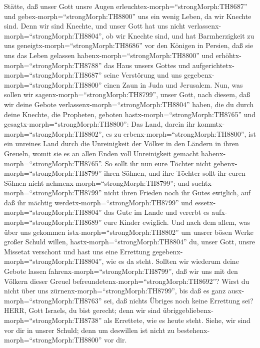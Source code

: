 Stätte, daß unser Gott unsre Augen
erleuchtex-morph=``strongMorph:TH8687'' und
gebex-morph=``strongMorph:TH8800'' uns ein wenig Leben, da wir Knechte
sind.  Denn wir sind Knechte, und unser Gott hat uns nicht
verlassenx-morph=``strongMorph:TH8804'', ob wir Knechte sind, und hat
Barmherzigkeit zu uns geneigtx-morph=``strongMorph:TH8686'' vor den
Königen in Persien, daß sie uns das Leben gelassen
habenx-morph=``strongMorph:TH8800'' und
erhöhtx-morph=``strongMorph:TH8788'' das Haus unsers Gottes und
aufgerichtetx-morph=``strongMorph:TH8687'' seine Verstörung und uns
gegebenx-morph=``strongMorph:TH8800'' einen Zaun in Juda und Jerusalem.
 Nun, was sollen wir sagenx-morph=``strongMorph:TH8799'',
unser Gott, nach diesem, daß wir deine Gebote
verlassenx-morph=``strongMorph:TH8804'' haben,  die du
durch deine Knechte, die Propheten, geboten
hastx-morph=``strongMorph:TH8765'' und
gesagtx-morph=``strongMorph:TH8800'': Das Land, darein ihr
kommtx-morph=``strongMorph:TH8802'', es zu
erbenx-morph=``strongMorph:TH8800'', ist ein unreines Land durch die
Unreinigkeit der Völker in den Ländern in ihren Greueln, womit sie es an
allen Enden voll Unreinigkeit gemacht
habenx-morph=``strongMorph:TH8765''.  So sollt ihr nun eure
Töchter nicht gebenx-morph=``strongMorph:TH8799'' ihren Söhnen, und ihre
Töchter sollt ihr euren Söhnen nicht
nehmenx-morph=``strongMorph:TH8799''; und
suchtx-morph=``strongMorph:TH8799'' nicht ihren Frieden noch ihr Gutes
ewiglich, auf daß ihr mächtig werdetx-morph=``strongMorph:TH8799'' und
essetx-morph=``strongMorph:TH8804'' das Gute im Lande und vererbt es
aufx-morph=``strongMorph:TH8689'' eure Kinder ewiglich. 
Und nach dem allem, was über uns gekommen
istx-morph=``strongMorph:TH8802'' um unsrer bösen Werke großer Schuld
willen, hastx-morph=``strongMorph:TH8804'' du, unser Gott, unsre
Missetat verschont und hast uns eine Errettung
gegebenx-morph=``strongMorph:TH8804'', wie es da steht. 
Sollten wir wiederum deine Gebote lassen
fahrenx-morph=``strongMorph:TH8799'', daß wir uns mit den Völkern dieser
Greuel befreundetenx-morph=``strongMorph:TH8692''? Wirst du nicht über
uns zürnenx-morph=``strongMorph:TH8799'', bis daß es ganz
ausx-morph=``strongMorph:TH8763'' sei, daß nichts Übriges noch keine
Errettung sei?  HERR, Gott Israels, du bist gerecht; denn
wir sind übriggebliebenx-morph=``strongMorph:TH8738'' als Errettete, wie
es heute steht. Siehe, wir sind vor dir in unsrer Schuld; denn um
deswillen ist nicht zu bestehenx-morph=``strongMorph:TH8800'' vor dir.

